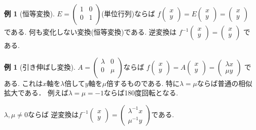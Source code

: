 \documentclass[dvipdfmx,a4paper,11pt]{article} %
\theoremstyle{definition}
\newtheorem{exa}[thm]{例}
\begin{document}
\begin{exa}[恒等変換]
$E =
  \begin{pmatrix}
 1& 0  \\
 0& 1  \\
 \end{pmatrix} 
$(単位行列)ならば
$
f\begin{pmatrix}
x \\ y
 \end{pmatrix} 
 =
 E
\begin{pmatrix}
x \\ y
 \end{pmatrix}  = 
 \begin{pmatrix}
x \\ y
 \end{pmatrix}
$
である. 何も変化しない変換(恒等変換)である.
逆変換は
$
f^{-1}\begin{pmatrix}
x \\ y
 \end{pmatrix} 
 =
\begin{pmatrix}
x \\ y
 \end{pmatrix}
$
である.
\end{exa}

 \begin{exa}[引き伸ばし変換]
$
A=\begin{pmatrix}
\lambda& 0 \\
0& \mu \\
\end{pmatrix}
$ならば
$
f\begin{pmatrix}
x \\ y
 \end{pmatrix} 
 =
 A
\begin{pmatrix}
x \\ y
 \end{pmatrix}  = 
 \begin{pmatrix}
\lambda x \\\mu y
 \end{pmatrix}
$
である.
これは$x$軸を$\lambda$倍して$y$軸を$\mu$倍するものである.
特に$\lambda=\mu$ならば普通の相似拡大である．
例えば$\lambda=\mu=-1$ならば180度回転となる. 

$\lambda, \mu \neq 0$ならば
逆変換は$
f^{-1}\begin{pmatrix}
x \\ y
 \end{pmatrix} 
 =
\begin{pmatrix}
\lambda ^{-1} x \\ \mu^{-1}y
 \end{pmatrix}
$である. 
\end{exa}
\end{document}
